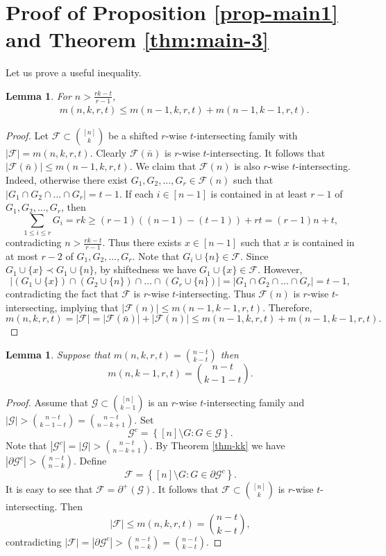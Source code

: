 \documentclass[11pt,a4paper]{article}
\newtheorem{lem}[thm]{Lemma}
\newtheorem{false statement}{False statement}
\theoremstyle{definition}
\def\hf{\mathcal{F}}
\def\hg{\mathcal{G}}
\begin{document}
\section{Proof of Proposition \ref{prop-main1} and Theorem \ref{thm:main-3}}




Let us prove a useful inequality.

\begin{lem}
For $n> \frac{rk-t}{r-1}$,
\begin{align}\label{ineq-2.1}
& m(n,k,r,t) \leq m(n-1,k,r,t) +m(n-1,k-1,r,t).
\end{align}
\end{lem}

\begin{proof}
Let $\hf\subset \binom{[n]}{k}$ be a shifted $r$-wise $t$-intersecting family with $|\hf| = m(n,k,r,t)$. Clearly $\hf(\bar{n})$ is $r$-wise $t$-intersecting. It follows that $|\hf(\bar{n})|\leq m(n-1,k,r,t)$. We claim that $\hf(n)$ is also $r$-wise $t$-intersecting. Indeed, otherwise  there exist $G_1,G_2,\ldots,G_r\in \hf(n)$ such that $|G_1\cap G_2\cap \ldots\cap G_r|=t-1$. If each $i\in[n-1]$ is contained in at least $r-1$ of $G_1,G_2,\ldots,G_r$, then
\[
\sum_{1\leq i\leq r} G_i =rk \geq (r-1)\left((n-1)-(t-1)\right)+rt=(r-1)n+t,
\]
contradicting $n> \frac{rk-t}{r-1}$. Thus there exists $x\in [n-1]$ such that $x$ is contained in  at most $r-2$ of $G_1,G_2,\ldots,G_r$. Note that $G_i\cup \{n\}\in \hf$. Since $G_1\cup \{x\} \prec G_1\cup \{n\}$, by shiftedness we have $G_1\cup \{x\}\in \hf$. However,
\[
|(G_1\cup \{x\})\cap (G_2\cup \{n\})\cap \ldots\cap (G_r\cup \{n\})|=|G_1\cap G_2\cap \ldots\cap G_r|=t-1,
\]
contradicting the fact that $\hf$ is $r$-wise $t$-intersecting. Thus $\hf(n)$ is $r$-wise $t$-intersecting, implying that $|\hf(n)|\leq m(n-1,k-1,r,t)$. Therefore,
\[
m(n,k,r,t)=|\hf| =|\hf(\bar{n})|+|\hf(n)|\leq m(n-1,k,r,t)+m(n-1,k-1,r,t).
\]
\end{proof}


\begin{lem}\label{lem-6.2}
Suppose that $m(n,k,r,t)=\binom{n-t}{k-t}$ then
\[
m(n,k-1,r,t) =\binom{n-t}{k-1-t}.
\]
\end{lem}

\begin{proof}
Assume that $\hg\subset \binom{[n]}{k-1}$ is an $r$-wise $t$-intersecting family and $|\hg|>\binom{n-t}{k-1-t}=\binom{n-t}{n-k+1}$. Set
\[
\hg^c= \left\{[n]\setminus G\colon G\in \hg\right\}.
\]
Note that $|\hg^c|=|\hg|>\binom{n-t}{n-k+1}$. By Theorem \ref{thm-kk} we have $|\partial \hg^c|>\binom{n-t}{n-k}$. Define
\[
\hf =\left\{[n]\setminus G\colon G\in \partial \hg^c\right\}.
\]
It is easy to see that  $\hf= \partial^+(\hg)$. It follows that $\hf\subset \binom{[n]}{k}$ is $r$-wise $t$-intersecting. Then
\[
|\hf| \leq m(n,k,r,t)=\binom{n-t}{k-t},
\]
contradicting $|\hf|= |\partial \hg^c|>\binom{n-t}{n-k}=\binom{n-t}{k-t}$.
\end{proof}
\end{document}
